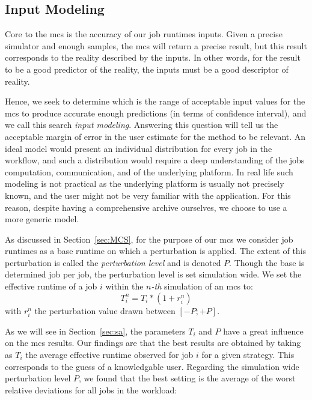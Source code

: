 \documentclass[10pt,conference,compsocconf]{IEEEtran}
\begin{document}
\subsection{Input Modeling}\label{sec:im}

Core  to the  \acl{mcs} is  the accuracy  of our  job runtimes  inputs. Given  a
precise simulator and enough samples, the \ac{mcs} will return a precise result,
but this  result corresponds to  the reality described  by the inputs.  In other
words, for the result to be a good  predictor of the reality, the inputs must be
a good descriptor of reality.

Hence, we seek  to determine which is  the range of acceptable  input values for
the  \ac{mcs} to  produce accurate  enough predictions  (in terms  of confidence
interval),  and we call this  search \emph{input  modeling}.  Answering  this
question will tell us the  acceptable margin of error in the  user estimate for the
method to be relevant.
An ideal  model would present  an individual distribution  for every job  in the
workflow, and such a distribution would require a deep understanding of the jobs
computation, communication, and  of the underlying platform.  In  real life such
modeling  is not  practical  as the  underlying platform  is  usually not
precisely  known, and  the user might not be very familiar with the application.
For this reason, despite having a comprehensive archive ourselves, we choose to 
use a more generic model.

As discussed in Section~\ref{sec:MCS}, for the purpose of our \ac{mcs} we
consider job runtimes as a base runtime on which a perturbation is applied. The
extent of this perturbation is called the \emph{perturbation level} and is
denoted $P$. Though the base is determined job per job, the perturbation level
is set simulation wide. We set the effective runtime of a job $i$ within the
$n$\textit{-th} simulation of an \ac{mcs} to: \[T_i^n = T_i * (1+r_i^n)\] with
$r_i^n$ the perturbation value drawn between $[-P;+P]$.

As we  will see  in Section~\ref{sec:sa},  the parameters $T_i$  and $P$  have a
great influence on the \ac{mcs} results.  Our findings are that the best results
are obtained by  taking as $T_i$ the average effective  runtime observed for job
$i$ for a given  strategy. This corresponds to the guess of a knowledgable user.
Regarding  the simulation  wide perturbation level  $P$, we found  that the best
setting  is the average  of the worst relative deviations for all jobs in the
workload:
\end{document}

